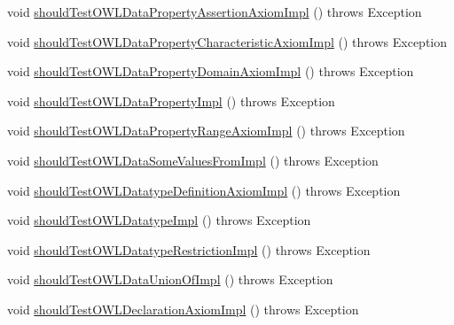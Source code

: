 \begin{DoxyCompactItemize}
void \hyperlink{classorg_1_1semanticweb_1_1owlapi_1_1contract_1_1_contract_owlapi__2_test_a58bec9ce2a5edef897ed78739e44cf04}{should\-Test\-O\-W\-L\-Data\-Property\-Assertion\-Axiom\-Impl} ()  throws Exception 
\item 
void \hyperlink{classorg_1_1semanticweb_1_1owlapi_1_1contract_1_1_contract_owlapi__2_test_aef1400137b06b8f9711c2854ed056cb6}{should\-Test\-O\-W\-L\-Data\-Property\-Characteristic\-Axiom\-Impl} ()  throws Exception 
\item 
void \hyperlink{classorg_1_1semanticweb_1_1owlapi_1_1contract_1_1_contract_owlapi__2_test_afc30eb2e2fab1c5fb4bef683041d5066}{should\-Test\-O\-W\-L\-Data\-Property\-Domain\-Axiom\-Impl} ()  throws Exception 
\item 
void \hyperlink{classorg_1_1semanticweb_1_1owlapi_1_1contract_1_1_contract_owlapi__2_test_a8e1f41a290c18617f9ae04b9f625e127}{should\-Test\-O\-W\-L\-Data\-Property\-Impl} ()  throws Exception 
\item 
void \hyperlink{classorg_1_1semanticweb_1_1owlapi_1_1contract_1_1_contract_owlapi__2_test_aa87a48b447ec0951fcb65ae9248ec6bd}{should\-Test\-O\-W\-L\-Data\-Property\-Range\-Axiom\-Impl} ()  throws Exception 
\item 
void \hyperlink{classorg_1_1semanticweb_1_1owlapi_1_1contract_1_1_contract_owlapi__2_test_a6d417eaad98852cf044f8cb53437391a}{should\-Test\-O\-W\-L\-Data\-Some\-Values\-From\-Impl} ()  throws Exception 
\item 
void \hyperlink{classorg_1_1semanticweb_1_1owlapi_1_1contract_1_1_contract_owlapi__2_test_a910b83733ccecdb12196293a71577ef5}{should\-Test\-O\-W\-L\-Datatype\-Definition\-Axiom\-Impl} ()  throws Exception 
\item 
void \hyperlink{classorg_1_1semanticweb_1_1owlapi_1_1contract_1_1_contract_owlapi__2_test_a132d59d3af84a268492929bda7d60016}{should\-Test\-O\-W\-L\-Datatype\-Impl} ()  throws Exception 
\item 
void \hyperlink{classorg_1_1semanticweb_1_1owlapi_1_1contract_1_1_contract_owlapi__2_test_ae6330a96f822009bb2d7e5857ec2333c}{should\-Test\-O\-W\-L\-Datatype\-Restriction\-Impl} ()  throws Exception 
\item 
void \hyperlink{classorg_1_1semanticweb_1_1owlapi_1_1contract_1_1_contract_owlapi__2_test_ad9c5806d0d6ad0f373c1cdbb45e879d7}{should\-Test\-O\-W\-L\-Data\-Union\-Of\-Impl} ()  throws Exception 
\item 
void \hyperlink{classorg_1_1semanticweb_1_1owlapi_1_1contract_1_1_contract_owlapi__2_test_aaf174e09dddf589b93e1cab0ca94980c}{should\-Test\-O\-W\-L\-Declaration\-Axiom\-Impl} ()  throws Exception 

\end{DoxyCompactItemize}
